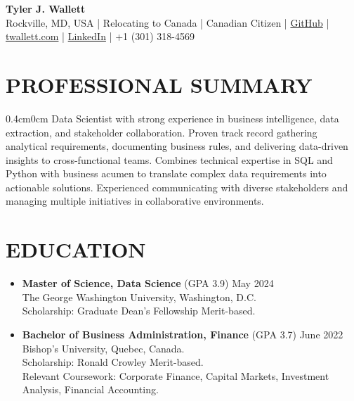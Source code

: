 \documentclass[a4paper,9pt]{extarticle}
\begin{document}
\thispagestyle{firstpage}

\begin{center}
\textbf{\Huge Tyler J. Wallett }\\[3pt] %
Rockville, MD, USA | Relocating to Canada | Canadian Citizen | \href{https://github.com/twallett}{GitHub} | \href{https://www.twallett.com}{twallett.com} | \href{https://www.linkedin.com/in/twallett/}{LinkedIn} | +1 (301) 318-4569  %
\end{center}

\section*{PROFESSIONAL SUMMARY}

\begin{adjustwidth}{0.4cm}{0cm}
Data Scientist with strong experience in business intelligence, data extraction, and stakeholder collaboration. Proven track record gathering analytical requirements, documenting business rules, and delivering data-driven insights to cross-functional teams. Combines technical expertise in SQL and Python with business acumen to translate complex data requirements into actionable solutions. Experienced communicating with diverse stakeholders and managing multiple initiatives in collaborative environments.
\end{adjustwidth}


\section*{EDUCATION}

\begin{itemize}[leftmargin=0.4cm, label={}]
    \item \textbf{Master of Science, Data Science} (GPA 3.9) \hfill May 2024 \\ 
    The George Washington University, Washington, D.C. \\ 
    Scholarship: Graduate Dean's Fellowship Merit-based.
\end{itemize}

\noindent
\begin{itemize}[leftmargin=0.4cm, label={}]
    \item \textbf{Bachelor of Business Administration, Finance} (GPA 3.7) \hfill June 2022 \\
    Bishop's University, Quebec, Canada. \\ 
    Scholarship: Ronald Crowley Merit-based. \\
    Relevant Coursework: Corporate Finance, Capital Markets, Investment Analysis, Financial Accounting.
\end{itemize}
\end{document}
